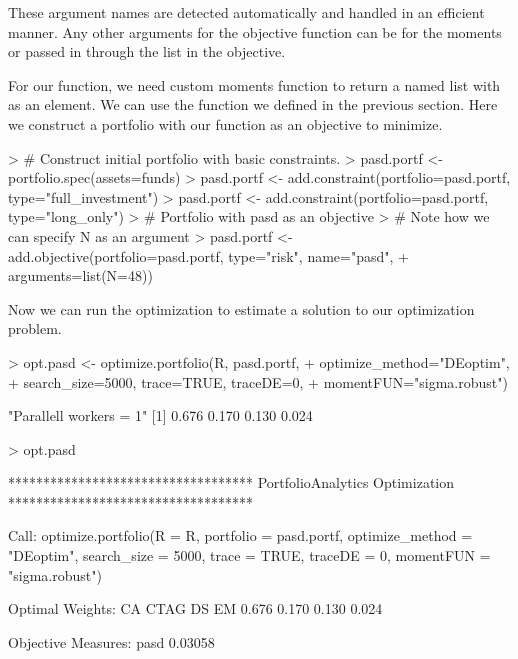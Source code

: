 \documentclass[a4paper]{article}
\begin{document}
These argument names are detected automatically and handled in an efficient manner. Any other arguments for the objective function can be for the moments or passed in through the  list in the objective.

For our  function, we need custom moments function to return a named list with  as an element. We can use the  function we defined in the previous section. Here we construct a portfolio with our  function as an objective to minimize.

\begin{Schunk}
\begin{Sinput}
> # Construct initial portfolio with basic constraints.
> pasd.portf <- portfolio.spec(assets=funds)
> pasd.portf <- add.constraint(portfolio=pasd.portf, type="full_investment")
> pasd.portf <- add.constraint(portfolio=pasd.portf, type="long_only")
> # Portfolio with pasd as an objective
> # Note how we can specify N as an argument
> pasd.portf <- add.objective(portfolio=pasd.portf, type="risk", name="pasd", 
+                             arguments=list(N=48))
\end{Sinput}
\end{Schunk}


Now we can run the optimization to estimate a solution to our optimization problem.
\begin{Schunk}
\begin{Sinput}
> opt.pasd <- optimize.portfolio(R, pasd.portf, 
+                                optimize_method="DEoptim", 
+                                search_size=5000, trace=TRUE, traceDE=0,
+                                momentFUN="sigma.robust")
\end{Sinput}
\begin{Soutput}
[1] "Parallell workers = 1"
[1] 0.676 0.170 0.130 0.024
\end{Soutput}
\begin{Sinput}
> opt.pasd
\end{Sinput}
\begin{Soutput}
***********************************
PortfolioAnalytics Optimization
***********************************

Call:
optimize.portfolio(R = R, portfolio = pasd.portf, optimize_method = "DEoptim", 
    search_size = 5000, trace = TRUE, traceDE = 0, momentFUN = "sigma.robust")

Optimal Weights:
   CA  CTAG    DS    EM 
0.676 0.170 0.130 0.024 

Objective Measures:
   pasd 
0.03058 
\end{Soutput}
\end{Schunk}
\end{document}
